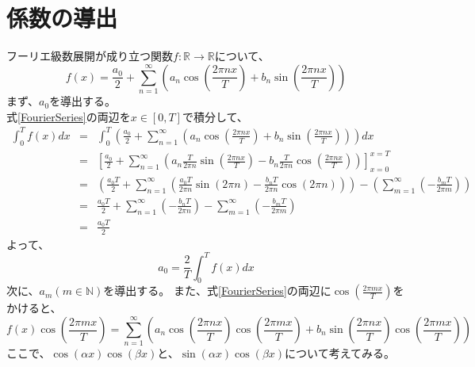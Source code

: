 \documentclass[a4paper]{jsarticle}
\begin{document}
\section{係数の導出}
フーリエ級数展開が成り立つ関数$f: \mathbb{R} \longrightarrow \mathbb{R}$について、
\begin{equation}
f \left( x \right) = \frac { a_0 } { 2 } + \sum _{ n = 1} ^{ \infty } \left( a_n \cos( \frac { 2 \pi nx } { T } ) + b_n \sin( \frac { 2 \pi nx } { T } ) \right)
\end{equation}
まず、$a_0$を導出する。\\
式\ref{FourierSeries}の両辺を$x \in \left[ 0,T \right]$で積分して、
\begin{eqnarray}
	\int _0 ^T f \left( x \right) dx &=& \int _0 ^T \left( \frac { a_0 } { 2 } + \sum _{ n = 1} ^{ \infty } \left( a_n \cos( \frac { 2 \pi nx } { T } ) + b_n \sin( \frac { 2 \pi nx } { T } ) \right) \right) dx \nonumber \\
	&=& \left[ \frac { a_0 } { 2 } + \sum _{ n = 1} ^\infty \left( a_n \frac { T } { 2 \pi n } \sin( \frac { 2 \pi nx } { T } ) - b_n \frac { T } { 2 \pi n } \cos( \frac { 2 \pi nx } { T } ) \right) \right] _{ x = 0 } ^{ x = T } \nonumber \\
	&=& \left( \frac { a_0T } { 2 } + \sum _{ n = 1 } ^\infty \left( \frac { a_0T } { 2 \pi n } \sin( 2 \pi n ) - \frac { b_nT } { 2 \pi n } \cos( 2 \pi n) \right) \right) - \left( \sum _{ m = 1 } ^\infty \left( - \frac { b_mT } { 2 \pi m } \right) \right) \nonumber \\
	&=& \frac { a_0T } { 2 } + \sum _{ n = 1 } ^\infty \left( - \frac { b_nT } { 2 \pi n } \right) - \sum _{ m = 1 } ^\infty \left( - \frac { b_mT } { 2 \pi m } \right) \nonumber \\
	&=& \frac { a_0T } { 2 }
\end{eqnarray}
よって、
\begin{equation}
a_0 = \frac { 2 } { T } \int _0 ^T f \left( x \right) dx
\end{equation}
次に、$a_m \left( m \in \mathbb{N} \right)$を導出する。
また、式\ref{FourierSeries}の両辺に$\cos(\frac { 2 \pi mx } { T })$をかけると、
\begin{equation}
	f \left( x \right) \cos(\frac { 2 \pi mx } { T }) = \sum _{ n = 1 } ^\infty \left( a_n \cos(\frac { 2 \pi nx } { T }) \cos(\frac { 2 \pi mx } { T }) + b_n \sin(\frac { 2 \pi nx } { T }) \cos(\frac { 2 \pi mx } { T }) \right)
\end{equation}
ここで、$\cos(\alpha x) \cos(\beta x)$と、$\sin(\alpha x) \cos(\beta x)$について考えてみる。\\
\end{document}

